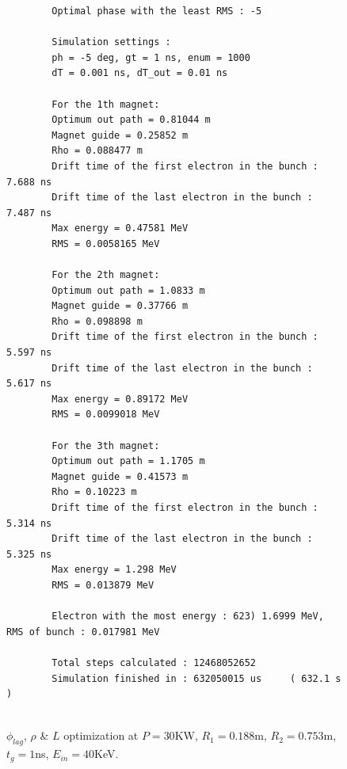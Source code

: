 \documentclass[a4paper,oneside,12pt]{report}
\numberwithin{equation}{chapter}
\begin{document}
\begin{figure}[H]
    \centering
    \begin{verbatim}
        Optimal phase with the least RMS : -5

        Simulation settings : 
        ph = -5 deg, gt = 1 ns, enum = 1000
        dT = 0.001 ns, dT_out = 0.01 ns
        
        For the 1th magnet:
        Optimum out path = 0.81044 m
        Magnet guide = 0.25852 m
        Rho = 0.088477 m
        Drift time of the first electron in the bunch : 7.688 ns
        Drift time of the last electron in the bunch : 7.487 ns
        Max energy = 0.47581 MeV
        RMS = 0.0058165 MeV
        
        For the 2th magnet:
        Optimum out path = 1.0833 m
        Magnet guide = 0.37766 m
        Rho = 0.098898 m
        Drift time of the first electron in the bunch : 5.597 ns
        Drift time of the last electron in the bunch : 5.617 ns
        Max energy = 0.89172 MeV
        RMS = 0.0099018 MeV
        
        For the 3th magnet:
        Optimum out path = 1.1705 m
        Magnet guide = 0.41573 m
        Rho = 0.10223 m
        Drift time of the first electron in the bunch : 5.314 ns
        Drift time of the last electron in the bunch : 5.325 ns
        Max energy = 1.298 MeV
        RMS = 0.013879 MeV

        Electron with the most energy : 623) 1.6999 MeV,	RMS of bunch : 0.017981 MeV
        
        Total steps calculated : 12468052652
        Simulation finished in : 632050015 us     ( 632.1 s )
        
    \end{verbatim}
    \vspace{20pt}
\caption{$\phi_{lag}$, $\rho$ \& $L$ optimization at $P=30$KW, $R_1=0.188$m, $R_2=0.753$m, $t_g=1$ns, $E_{in}=40$KeV.}
\label{fig:lout_opt_1ns_Erms}
\end{figure}
\end{document}
